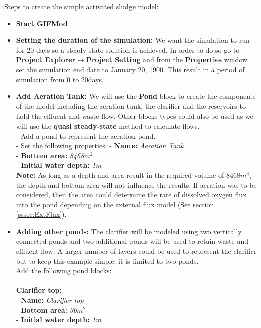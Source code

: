 Steps to create the simple activated sludge model:
\begin{itemize}
\item \textbf{Start GIFMod}
\item \textbf{Setting the duration of the simulation: } We want the simulation to run for 20 days so a 
steady-state solution is achieved. In order to do so go to \textbf{Project Explorer}$\rightarrow$\textbf{Project Setting} and from the \textbf{Properties} window set the simulation end date to January 20, 1900. This result in a period of simulation from 0 to 20days. 
\item \textbf{Add Aeration Tank: } We will use the \textbf{Pond} block to create the components of the model including the aeration tank, the clarifier and the reservoirs to hold the effluent and waste flow. Other blocks types could also be used as we will use the \textbf{quasi steady-state} method to calculate flows. \\
- Add a pond to represent the aeration pond. \\
- Set the following properties: 
- \textbf{Name: } \textit{Aeration Tank} \\
- \textbf{Bottom area: }\textit{8468$m^2$} \\
- \textbf{Initial water depth: }\textit{1m} \\
\textbf{Note: } As long as a depth and area result in the required volume of 8468$m^3$, the depth and bottom area will not influence the results. If aeration was to be considered, then the area could determine the rate of dissolved oxygen flux into the pond depending on the external flux model (See section \ref{sssec:ExtFlux}).\\ 
\item \textbf{Adding other ponds: } The clarifier will be modeled using two vertically connected ponds and two additional ponds will be used to retain waste and effluent flow. A larger number of layers could be used to represent the clarifier but to keep this example simple, it is limited to two ponds. \\
Add the following pond blocks:\\\\
\textbf{Clarifier top: }\\
- \textbf{Name: } \textit{Clarifier top} \\
- \textbf{Bottom area: }\textit{30$m^2$} \\
- \textbf{Initial water depth: }\textit{1m} \\\\

\end{itemize}

